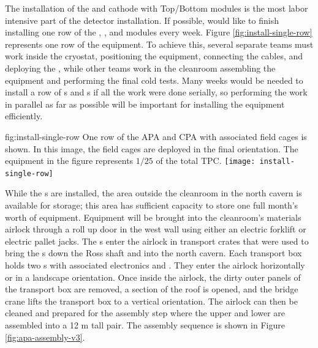 The installation of the  and cathode with Top/Bottom  modules is the most labor intensive part of the detector installation. If possible,  would like to finish installing one row of the , , and  modules every week. Figure \ref{fig:install-single-row} represents one row of the equipment. To achieve this, several separate teams must work inside the cryostat, positioning the equipment, connecting the cables, and deploying the , while  other teams work in the cleanroom assembling the equipment and performing the final cold tests. Many weeks would be needed to install a row of s and s if all the work were done serially, so performing the work in parallel  as far as possible will be important for installing the equipment efficiently. 


\begin{dunefigure}{fig:install-single-row}
{One row of the APA and CPA with associated field cages is shown. In this  image, the field cages are deployed in the final orientation. The equipment in the figure represents $1/25$ of the total TPC.}
 \texttt{[image: install-single-row]}
\end{dunefigure}

While the s are installed, the area outside the cleanroom in the north cavern is available for storage; this area has sufficient capacity to store one full month's worth of equipment. 
Equipment will be brought into the cleanroom's materials airlock through a roll up door in the west wall using either an electric forklift or electric pallet jacks.  
The s enter the airlock in transport crates that were used to bring the s down the Ross shaft and into the north cavern. 
Each transport box holds two s with associated electronics and . They enter the airlock horizontally or in a landscape orientation. 
Once inside the airlock, the dirty outer panels of the transport box are removed, a section of the roof is opened, and the bridge crane lifts the transport box to a vertical orientation. 
The airlock can then be cleaned and prepared for the  assembly step where the upper and lower  are assembled into a 12 \si{m} tall pair.
The  assembly sequence is shown in Figure \ref{fig:apa-assembly-v3}.

